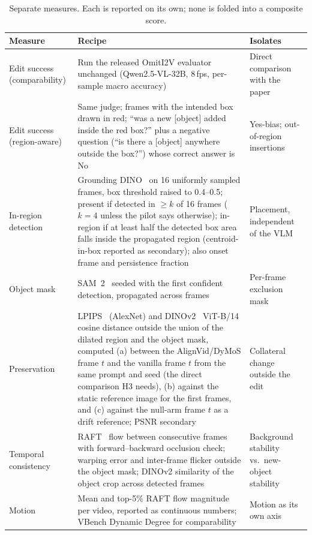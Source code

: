 \documentclass[10pt,a4paper]{article}
\begin{document}
\begin{table}[!htbp]\centering\small
\begin{tabular}{@{}p{2.6cm}p{7.9cm}p{4.7cm}@{}}
\toprule
Measure & Recipe & Isolates \\
\midrule
Edit success (comparability) & Run the released OmitI2V evaluator unchanged (Qwen2.5-VL-32B, 8\,fps, per-sample macro accuracy) & Direct comparison with the paper \\
Edit success (region-aware) & Same judge; frames with the intended box drawn in red; ``was a new [object] added inside the red box?'' plus a negative question (``is there a [object] anywhere outside the box?'') whose correct answer is No~\cite{point2insert,five} & Yes-bias; out-of-region insertions \\
In-region detection & Grounding DINO~\cite{gdino} on 16 uniformly sampled frames, box threshold raised to 0.4--0.5; present if detected in $\ge k$ of 16 frames ($k = 4$ unless the pilot says otherwise); in-region if at least half the detected box area falls inside the propagated region (centroid-in-box reported as secondary); also onset frame and persistence fraction & Placement, independent of the VLM \\
Object mask & SAM~2~\cite{sam2} seeded with the first confident detection, propagated across frames & Per-frame exclusion mask \\
Preservation & LPIPS~\cite{lpips} (AlexNet) and DINOv2~\cite{dinov2} ViT-B/14 cosine distance outside the union of the dilated region and the object mask, computed (a) between the AlignVid/DyMoS frame $t$ and the vanilla frame $t$ from the same prompt and seed (the direct comparison H3 needs), (b) against the static reference image for the first frames, and (c) against the null-arm frame $t$ as a drift reference; PSNR secondary & Collateral change outside the edit \\
Temporal consistency & RAFT~\cite{raft} flow between consecutive frames with forward--backward occlusion check; warping error and inter-frame flicker outside the object mask; DINOv2 similarity of the object crop across detected frames & Background stability vs.\ new-object stability \\
Motion & Mean and top-5\% RAFT flow magnitude per video, reported as continuous numbers; VBench Dynamic Degree for comparability & Motion as its own axis \\
\bottomrule
\end{tabular}
\caption{Separate measures. Each is reported on its own; none is folded into a composite score.}
\label{tab:measures}
\end{table}
\end{document}
